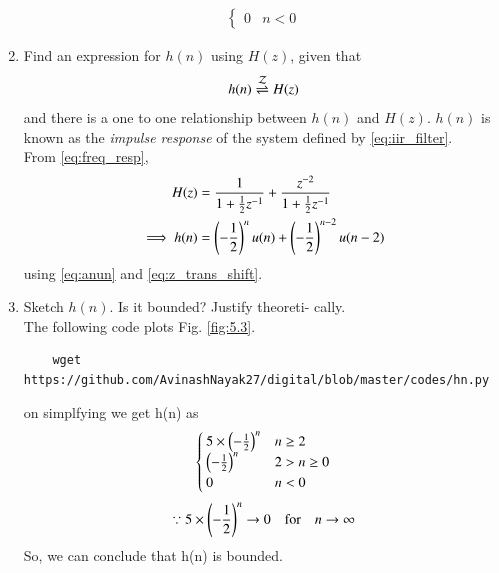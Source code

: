 \documentclass[journal,12pt,twocolumn]{IEEEtran}
\renewcommand\thesection{\arabic{section}}
\begin{document}
\begin{enumerate}[label=\thesection.\arabic*]
\begin{align}
\begin{cases}
          0 &n<0
        \end{cases}
      \end{align}
      \item \label{prob:impulse_resp}
      Find an expression for $h(n)$ using $H(z)$, given that 
      \begin{equation}
        \label{eq:impulse_resp}
        h(n) \overset{\mathcal{Z}}{ \rightleftharpoons} H(z)
      \end{equation}
      and there is a one to one relationship between $h(n)$ and $H(z)$. $h(n)$ is known as the {\em impulse response} of the
      system defined by \eqref{eq:iir_filter}.
      \\
      \solution From \eqref{eq:freq_resp},
      \begin{align}
        H(z) &= \frac{1}{1 + \frac{1}{2}z^{-1}} + \frac{ z^{-2}}{1 + \frac{1}{2}z^{-1}}
        \\
        \implies h(n) &= \left(-\frac{1}{2}\right)^{n}u(n) + \left(-\frac{1}{2}\right)^{n-2}u(n-2)
      \end{align}
      using \eqref{eq:anun} and \eqref{eq:z_trans_shift}.
      \item Sketch $h(n)$. Is it bounded? Justify theoreti-
      cally.
      \\
      \solution The following code plots Fig. \ref{fig:5.3}.
      \begin{lstlisting}
    wget https://github.com/AvinashNayak27/digital/blob/master/codes/hn.py
      \end{lstlisting}
      on simplfying we get h(n) as
      \begin{align}
        \begin{cases}
          5\times \left(-\frac{1}{2}\right)^n  & n\geq 2\\
          \left(-\frac{1}{2}\right)^n  &2>n\geq0\\
          0 &n<0
        \end{cases}
      \end{align}
      \begin{align}
        \because 5\times \left(-\frac{1}{2}\right)^n \to 0 \quad	\text{for} \quad n\to \infty 
      \end{align}
      So, we can conclude that h(n) is bounded.
      \begin{figure}[!ht]
        \centering

\end{figure}
\end{enumerate}
\end{document}

